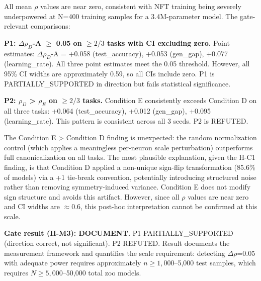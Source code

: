 All mean $\rho$ values are near zero, consistent with NFT training being severely underpowered at N=400 training samples for a 3.4M-parameter model. The gate-relevant comparisons:

\textbf{P1: $\Delta\rho_{D}$-A $\geq$ 0.05 on $\geq 2/3$ tasks with CI excluding zero.} Point estimates: $\Delta\rho_{D}$-A = +0.058 (test\_accuracy), +0.053 (gen\_gap), +0.077 (learning\_rate). All three point estimates meet the 0.05 threshold. However, all 95\% CI widths are approximately 0.59, so all CIs include zero. P1 is PARTIALLY\_SUPPORTED in direction but fails statistical significance.

\textbf{P2: $\rho_{D}$ > $\rho_{E}$ on $\geq 2/3$ tasks.} Condition E consistently exceeds Condition D on all three tasks: +0.064 (test\_accuracy), +0.012 (gen\_gap), +0.095 (learning\_rate). This pattern is consistent across all 3 seeds. P2 is REFUTED.

The Condition E > Condition D finding is unexpected: the random normalization control (which applies a meaningless per-neuron scale perturbation) outperforms full canonicalization on all tasks. The most plausible explanation, given the H-C1 finding, is that Condition D applied a non-unique sign-flip transformation (85.6\% of models) via a +1 tie-break convention, potentially introducing structured noise rather than removing symmetry-induced variance. Condition E does not modify sign structure and avoids this artifact. However, since all $\rho$ values are near zero and CI widths are $\approx 0.6$, this post-hoc interpretation cannot be confirmed at this scale.

\textbf{Gate result (H-M3): DOCUMENT.} P1 PARTIALLY\_SUPPORTED (direction correct, not significant). P2 REFUTED. Result documents the measurement framework and quantifies the scale requirement: detecting $\Delta\rho$=0.05 with adequate power requires approximately $n\geq 1,000$--5,000 test samples, which requires $N\geq 5,000$--50,000 total zoo models.

